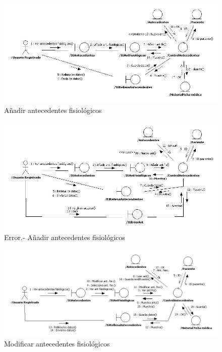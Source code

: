 		\bigskip
		\bigskip
		\begin{figure}[H]
		  \centering
		    \includegraphics[width=16cm]{img/jpg/colaboraciones/33_AnadirAntecedente.jpg}
		  \caption{Añadir antecedentes fisiológicos}
		  \label{fig:col_ant_fis_fm_anadir}
		\end{figure}
		
		\bigskip
		\bigskip
		\begin{figure}[H]
		  \centering
		    \includegraphics[width=16cm]{img/jpg/colaboraciones/34_AnadirAntecedenteError.jpg}
		  \caption{Error.- Añadir antecedentes fisiológicos}
		  \label{fig:col_ant_fis_fm_anadir_err}
		\end{figure}
		
		\begin{figure}[H]
		  \centering
		    \includegraphics[width=16cm]{img/jpg/colaboraciones/35_ModificarAntecedente.jpg}
		  \caption{Modificar antecedentes fisiológicos}
		  \label{fig:col_ant_fis_fm_modificar}
		\end{figure}
		
